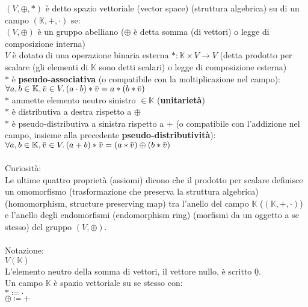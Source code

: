 \documentclass[a4paper, twoside, italian, 11pt]{book}
\newcommand{\overbar}[1] {\mkern 1.5mu\overline{\mkern-1.5mu#1\mkern-1.5mu}\mkern 1.5mu}
\newcommand{\K}{\mathbb K}
\begin{document}
$(V, \oplus, *)$ è detto spazio vettoriale (vector space) (struttura algebrica) su di un campo $(\K, +, \cdot)$ se: \\

\noindent
$(V, \oplus)$ è un gruppo abelliano ($\oplus$ è detta somma (di vettori) o legge di composizione interna) \\

\noindent
$V$ è dotato di una operazione binaria esterna $* : \K \times V \rightarrow V$ (detta prodotto per scalare (gli elementi di $\K$ sono detti scalari) o legge di composizione esterna) \\

\noindent
$*$ è \textbf{pseudo-associativa} (o compatibile con la moltiplicazione nel campo): \\
\indent
$\forall a, b \in \K, \overbar v \in V \ldotp (a \cdot b) * \overbar v = a * (b * \overbar v)$ \\

\noindent
$*$ ammette elemento neutro sinistro $\in \K$ (\textbf{unitarietà}) \\

\noindent
$*$ è distributiva a destra rispetto a $\oplus$ \\

\noindent
$*$ è pseudo-distributiva a sinistra rispetto a $+$ (o compatibile con l'addizione nel campo, insieme alla precedente \textbf{pseudo-distributività}): \\
\indent
$\forall a, b \in \K, \overbar v \in V \ldotp (a + b) * \overbar v = (a * \overbar v) \oplus (b * \overbar v)$ \\\\


\noindent
Curiosità: \\
Le ultime quattro proprietà (assiomi) dicono che il prodotto per scalare definisce un omomorfismo (trasformazione che preserva la struttura algebrica) (homomorphism, structure preserving map) tra l'anello del campo $\K$ ($(\K, +, \cdot)$) e l'anello degli endomorfismi (endomorphism ring) (morfismi da un oggetto a se stesso) del gruppo $(V, \oplus)$. \\\\

\noindent
Notazione: \\
\indent
$V(\K)$ \\
L'elemento neutro della somma di vettori, il vettore nullo, è scritto $\underline 0$. \\

\noindent
Un campo $\K$ è spazio vettoriale su se stesso con: \\
\indent
$* \coloneqq \cdot$ \\
\indent
$\oplus \coloneqq +$\\
\end{document}
